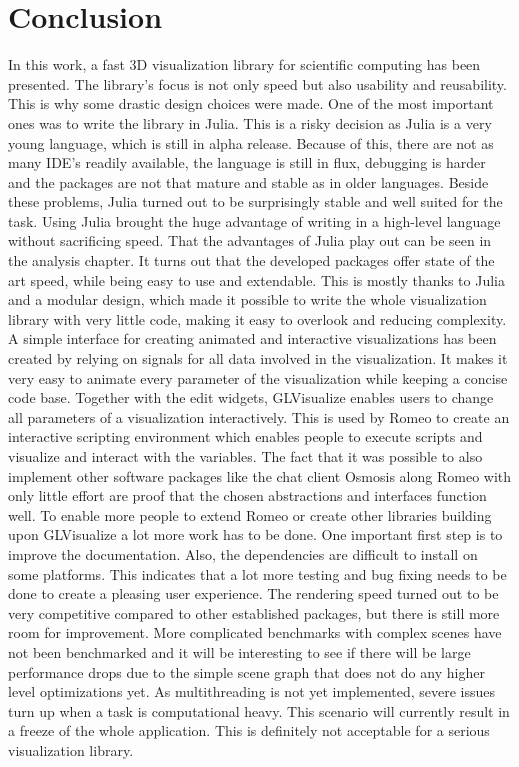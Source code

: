 \section{Conclusion}

In this work, a fast 3D visualization library for scientific computing has been presented. 
The library's focus is not only speed but also usability and reusability. 
This is why some drastic design choices were made.
One of the most important ones was to write the library in Julia. 
This is a risky decision as Julia is a very young language, which is still in alpha release. 
Because of this, there are not as many IDE's readily available, the language is still in flux, debugging is harder and the packages are not that mature and stable as in older languages.
Beside these problems, Julia turned out to be surprisingly stable and well suited for the task.
Using Julia brought the huge advantage of writing in a high-level language without sacrificing speed. 
That the advantages of Julia play out can be seen in the analysis chapter. It turns out that the developed packages offer state of the art speed, while being easy to use and extendable. 
This is mostly thanks to Julia and a modular design, which made it possible to write the whole visualization library with very little code, making it easy to overlook and reducing complexity. 
A simple interface for creating animated and interactive visualizations has been created by relying on signals for all data involved in the visualization.
It makes it very easy to animate every parameter of the visualization while keeping a concise code base.
Together with the edit widgets, GLVisualize enables users to change all parameters of a visualization interactively. 
This is used by Romeo to create an interactive scripting environment which enables people to execute scripts and visualize and interact with the variables.
The fact that it was possible to also implement other software packages like the chat client Osmosis along Romeo with only little effort are proof that the chosen abstractions and interfaces function well.
To enable more people to extend Romeo or create other libraries building upon GLVisualize a lot more work has to be done. 
One important first step is to improve the documentation. 
Also, the dependencies are difficult to install on some platforms. This indicates that a lot more testing and bug fixing needs to be done to create a pleasing user experience.
The rendering speed turned out to be very competitive compared to other established packages, but there is still more room for improvement.
More complicated benchmarks with complex scenes have not been benchmarked and it will be interesting to see if there will be large performance drops due to the simple scene graph that does not do any higher level optimizations yet.
As multithreading is not yet implemented, severe issues turn up when a task is computational heavy. This scenario will currently result in a freeze of the whole application. This is definitely not acceptable for a serious visualization library.
 
